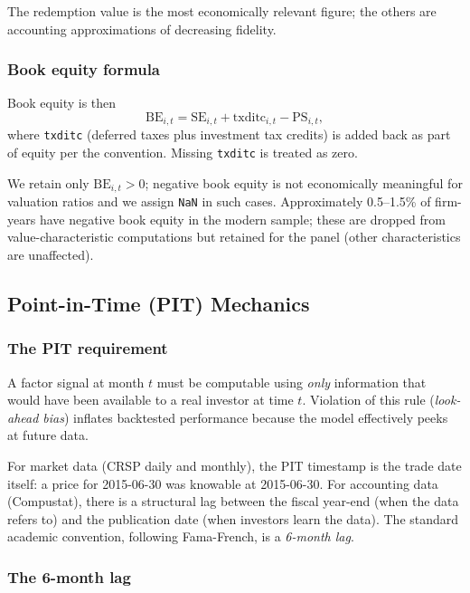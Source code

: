 The redemption value is the most economically relevant figure; the
others are accounting approximations of decreasing fidelity.

\subsubsection{Book equity formula}

Book equity is then
\begin{equation}
\mathrm{BE}_{i,t} = \mathrm{SE}_{i,t} + \mathrm{txditc}_{i,t} - \mathrm{PS}_{i,t},
\label{eq:be-defn}
\end{equation}
where \texttt{txditc} (deferred taxes plus investment tax credits) is
added back as part of equity per the
\cite{DavisFamaFrench2000} convention. Missing \texttt{txditc} is
treated as zero.

We retain only \(\mathrm{BE}_{i,t} > 0\); negative book equity is not
economically meaningful for valuation ratios and we assign \texttt{NaN}
in such cases. Approximately 0.5--1.5\% of firm-years have negative book
equity in the modern sample; these are dropped from value-characteristic
computations but retained for the panel (other characteristics are
unaffected).

\subsection{Point-in-Time (PIT) Mechanics}
\label{subsec:stage0-pit}

\subsubsection{The PIT requirement}

A factor signal at month \(t\) must be computable using \emph{only}
information that would have been available to a real investor at time
\(t\). Violation of this rule (\emph{look-ahead bias}) inflates
backtested performance because the model effectively peeks at future
data.

For market data (CRSP daily and monthly), the PIT timestamp is the
trade date itself: a price for 2015-06-30 was knowable at 2015-06-30.
For accounting data (Compustat), there is a structural lag between the
fiscal year-end (when the data refers to) and the publication date
(when investors learn the data). The standard academic convention,
following Fama-French, is a \emph{6-month lag}.

\subsubsection{The 6-month lag}

